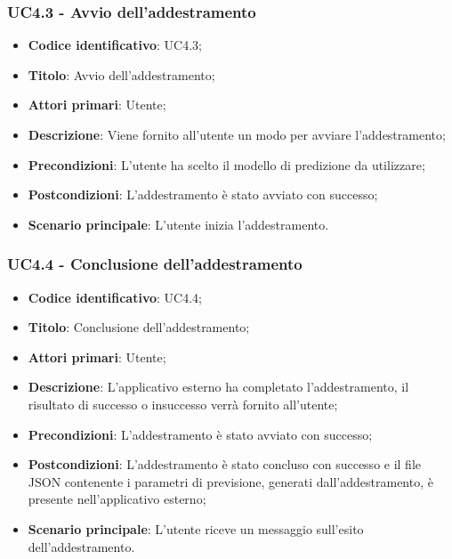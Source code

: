 \subsubsection{UC4.3 - Avvio dell'addestramento}
\begin{itemize}
    \item \textbf{Codice identificativo}: UC4.3;
    \item \textbf{Titolo}: Avvio dell'addestramento;
    \item \textbf{Attori primari}: Utente;
    \item \textbf{Descrizione}: Viene fornito all'utente un modo per avviare l'addestramento;
    \item \textbf{Precondizioni}: L'utente ha scelto il modello di predizione da utilizzare;
    \item \textbf{Postcondizioni}: L'addestramento è stato avviato con successo;
    \item \textbf{Scenario principale}: L'utente inizia l'addestramento.
\end{itemize}

\subsubsection{UC4.4 - Conclusione dell'addestramento}
\begin{itemize}
    \item \textbf{Codice identificativo}: UC4.4;
    \item \textbf{Titolo}: Conclusione dell'addestramento;
    \item \textbf{Attori primari}: Utente;
    \item \textbf{Descrizione}: L'applicativo esterno ha completato l'addestramento, il risultato di successo o insuccesso verrà fornito all'utente;
    \item \textbf{Precondizioni}: L'addestramento è stato avviato con successo;
    \item \textbf{Postcondizioni}: L'addestramento è stato concluso con successo e il file JSON contenente i parametri di previsione, generati dall'addestramento, è presente nell'applicativo esterno;
    \item \textbf{Scenario principale}: L'utente riceve un messaggio sull'esito dell'addestramento.
\end{itemize}

